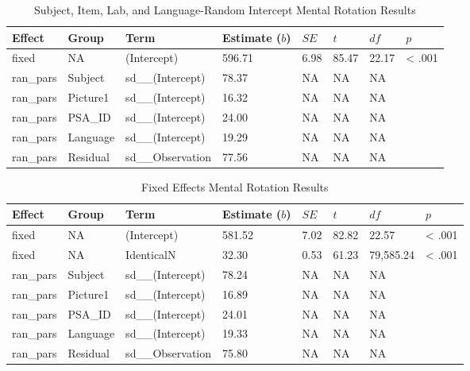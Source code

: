 \documentclass[
  man,floatsintext]{apa7}
\begin{document}
\begin{table}[tbp]

\begin{center}
\begin{threeparttable}

\caption{\label{tab:lang_e}Subject, Item, Lab, and Language-Random Intercept Mental Rotation Results}

\begin{tabular}{llllllll}
\toprule
Effect & Group & Term & Estimate ($b$) & $SE$ & $t$ & $df$ & $p$\\
\midrule
fixed & NA & (Intercept) & 596.71 & 6.98 & 85.47 & 22.17 & < .001\\
ran\_pars & Subject & sd\_\_(Intercept) & 78.37 & NA & NA & NA & \\
ran\_pars & Picture1 & sd\_\_(Intercept) & 16.32 & NA & NA & NA & \\
ran\_pars & PSA\_ID & sd\_\_(Intercept) & 24.00 & NA & NA & NA & \\
ran\_pars & Language & sd\_\_(Intercept) & 19.29 & NA & NA & NA & \\
ran\_pars & Residual & sd\_\_Observation & 77.56 & NA & NA & NA & \\
\bottomrule
\end{tabular}

\end{threeparttable}
\end{center}

\end{table}

\begin{table}[tbp]

\begin{center}
\begin{threeparttable}

\caption{\label{tab:fixed_e}Fixed Effects Mental Rotation Results}

\begin{tabular}{llllllll}
\toprule
Effect & Group & Term & Estimate ($b$) & $SE$ & $t$ & $df$ & $p$\\
\midrule
fixed & NA & (Intercept) & 581.52 & 7.02 & 82.82 & 22.57 & < .001\\
fixed & NA & IdenticalN & 32.30 & 0.53 & 61.23 & 79,585.24 & < .001\\
ran\_pars & Subject & sd\_\_(Intercept) & 78.24 & NA & NA & NA & \\
ran\_pars & Picture1 & sd\_\_(Intercept) & 16.89 & NA & NA & NA & \\
ran\_pars & PSA\_ID & sd\_\_(Intercept) & 24.01 & NA & NA & NA & \\
ran\_pars & Language & sd\_\_(Intercept) & 19.33 & NA & NA & NA & \\
ran\_pars & Residual & sd\_\_Observation & 75.80 & NA & NA & NA & \\
\bottomrule
\end{tabular}

\end{threeparttable}
\end{center}

\end{table}
\end{document}

